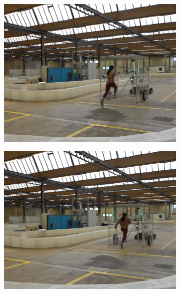 \documentclass[a4paper,12pt,oneside]{book}
\begin{document}
\begin{figure}[h!]
\begin{subfigure}[b]{0.24\textwidth}
        \includegraphics[width=\textwidth]{Catch/Catch5.png}
    \end{subfigure}
\hfill
    \begin{subfigure}[b]{0.24\textwidth}
        \includegraphics[width=\textwidth]{Catch/Catch6.png}
    \end{subfigure}
\hfill
    \begin{subfigure}[b]{0.24\textwidth}

\end{subfigure}
\end{figure}
\end{document}
